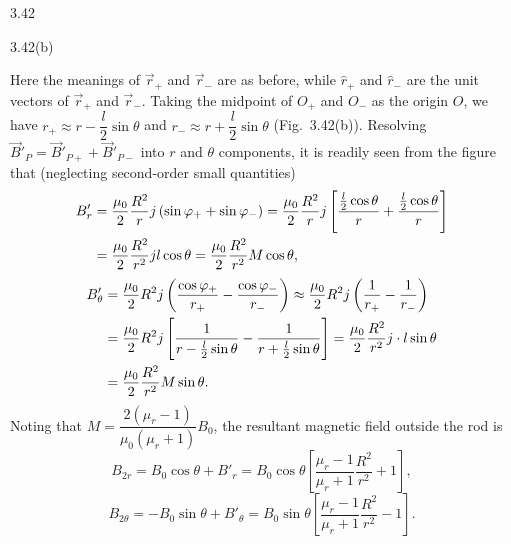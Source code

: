 \begin{solution}{3.42}
\begin{figbox}{3.42(b)}
\end{figbox}

Here the meanings of $\vec{r}_+$ and $\vec{r}_-$ are as before, while $\hat{r}_+$ and $\hat{r}_-$ are the unit vectors of $\vec{r}_+$ and $\vec{r}_-$. Taking the midpoint of $O_+$ and $O_-$ as the origin $O$, we have $r_+\approx r-\dfrac{l}{2}\sin\theta$ and $r_-\approx r+\dfrac{l}{2}\sin\theta$ (Fig.~3.42(b)). Resolving $\vec{B}'_P=\vec{B}'_{P+}+\vec{B}'_{P-}$ into $r$ and $\theta$ components, it is readily seen from the figure that (neglecting second-order small quantities)
\begin{align}
B'_r&=\frac{\mu_0}{2}\frac{R^2}{r}j\left(\sin\varphi_++\sin\varphi_-\right)
=\frac{\mu_0}{2}\frac{R^2}{r}j\left[\frac{\frac{l}{2}\cos\theta}{r}+\frac{\frac{l}{2}\cos\theta}{r}\right]\notag\\
&=\frac{\mu_0}{2}\frac{R^2}{r^2}jl\cos\theta
=\frac{\mu_0}{2}\frac{R^2}{r^2}M\cos\theta,\notag
\end{align}
\begin{align}
B'_\theta&=\frac{\mu_0}{2}R^2j\left(\frac{\cos\varphi_+}{r_+}-\frac{\cos\varphi_-}{r_-}\right)
\approx\frac{\mu_0}{2}R^2j\left(\frac{1}{r_+}-\frac{1}{r_-}\right)\notag\\
&=\frac{\mu_0}{2}R^2j\left[\frac{1}{r-\frac{l}{2}\sin\theta}-\frac{1}{r+\frac{l}{2}\sin\theta}\right]
=\frac{\mu_0}{2}\frac{R^2}{r^2}j\cdot l\sin\theta\notag\\
&=\frac{\mu_0}{2}\frac{R^2}{r^2}M\sin\theta.\notag
\end{align}
Noting that $M=\dfrac{2(\mu_r-1)}{\mu_0(\mu_r+1)}B_0$, the resultant magnetic field outside the rod is
\[
B_{2r}=B_0\cos\theta+B'_r=B_0\cos\theta\left[\frac{\mu_r-1}{\mu_r+1}\frac{R^2}{r^2}+1\right],
\]
\[
B_{2\theta}=-B_0\sin\theta+B'_\theta=B_0\sin\theta\left[\frac{\mu_r-1}{\mu_r+1}\frac{R^2}{r^2}-1\right].
\]
\end{solution}

